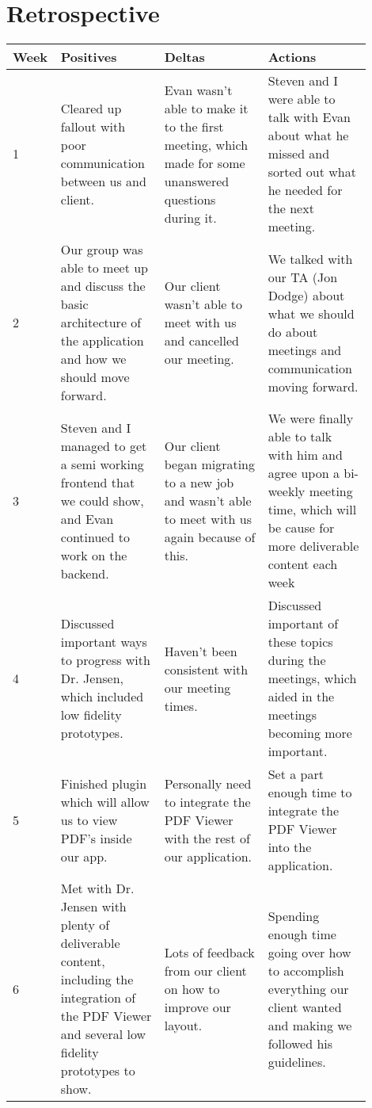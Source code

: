 \documentclass[onecolumn, draftclsnofoot,10pt, compsoc]{IEEEtran}
\begin{document}
\section{Retrospective}
\begin{tabular}{|p{0.05\linewidth}|p{0.285\linewidth}|p{0.285\linewidth}|p{0.285\linewidth}|}
\hline
	Week & Positives & Deltas & Actions \\ \hline

	1
	& Cleared up fallout with poor communication between us and client.
	& Evan wasn't able to make it to the first meeting, which made for some unanswered questions during it.
	& Steven and I were able to talk with Evan about what he missed and sorted out what he needed for the next meeting. \\ \hline

	2
	& Our group was able to meet up and discuss the basic architecture of the application and how we should move forward.
	& Our client wasn't able to meet with us and cancelled our meeting.
	& We talked with our TA (Jon Dodge) about what we should do about meetings and communication moving forward. \\ \hline

	3
	& Steven and I managed to get a semi working frontend that we could show, and Evan continued to work on the backend.
	& Our client began migrating to a new job and wasn't able to meet with us again because of this.
	& We were finally able to talk with him and agree upon a bi-weekly meeting time, which will be cause for more deliverable content each week  \\ \hline

	4
	& Discussed important ways to progress with Dr. Jensen, which included low fidelity prototypes.
	& Haven't been consistent with our meeting times.
	& Discussed important of these topics during the meetings, which aided in the meetings becoming more important.  \\ \hline

	5
	& Finished plugin which will allow us to view PDF's inside our app.
	& Personally need to integrate the PDF Viewer with the rest of our application.
	& Set a part enough time to integrate the PDF Viewer into the application. \\ \hline

	6
	& Met with Dr. Jensen with plenty of deliverable content, including the integration of the PDF Viewer and several low fidelity prototypes to show.
	& Lots of feedback from our client on how to improve our layout.
	& Spending enough time going over how to accomplish everything our client wanted and making we followed his guidelines.  \\ \hline


\end{tabular}
\end{document}
